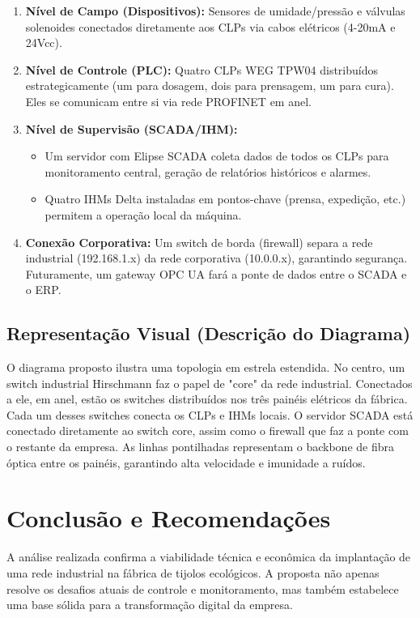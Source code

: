 \documentclass[12pt,a4paper]{article}
\begin{document}
\begin{enumerate}
    \item \textbf{Nível de Campo (Dispositivos):} Sensores de umidade/pressão e válvulas solenoides conectados diretamente aos CLPs via cabos elétricos (4-20mA e 24Vcc).
    \item \textbf{Nível de Controle (PLC):} Quatro CLPs WEG TPW04 distribuídos estrategicamente (um para dosagem, dois para prensagem, um para cura). Eles se comunicam entre si via rede PROFINET em anel.
    \item \textbf{Nível de Supervisão (SCADA/IHM):}
        \begin{itemize}
            \item Um servidor com Elipse SCADA coleta dados de todos os CLPs para monitoramento central, geração de relatórios históricos e alarmes.
            \item Quatro IHMs Delta instaladas em pontos-chave (prensa, expedição, etc.) permitem a operação local da máquina.
        \end{itemize}
    \item \textbf{Conexão Corporativa:} Um switch de borda (firewall) separa a rede industrial (192.168.1.x) da rede corporativa (10.0.0.x), garantindo segurança. Futuramente, um gateway OPC UA fará a ponte de dados entre o SCADA e o ERP.
\end{enumerate}

\subsection{Representação Visual (Descrição do Diagrama)}
O diagrama proposto ilustra uma topologia em estrela estendida. No centro, um switch industrial Hirschmann faz o papel de "core" da rede industrial. Conectados a ele, em anel, estão os switches distribuídos nos três painéis elétricos da fábrica. Cada um desses switches conecta os CLPs e IHMs locais. O servidor SCADA está conectado diretamente ao switch core, assim como o firewall que faz a ponte com o restante da empresa. As linhas pontilhadas representam o backbone de fibra óptica entre os painéis, garantindo alta velocidade e imunidade a ruídos.

\section{Conclusão e Recomendações}
A análise realizada confirma a viabilidade técnica e econômica da implantação de uma rede industrial na fábrica de tijolos ecológicos. A proposta não apenas resolve os desafios atuais de controle e monitoramento, mas também estabelece uma base sólida para a transformação digital da empresa.
\end{document}
